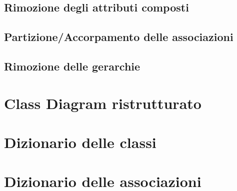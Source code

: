         \subsection{Rimozione degli attributi composti}
            
        \subsection{Partizione/Accorpamento delle associazioni}
            
        \subsection{Rimozione delle gerarchie}
    
    \section{Class Diagram ristrutturato}
        
    \section{Dizionario delle classi}
        
    \section{Dizionario delle associazioni}